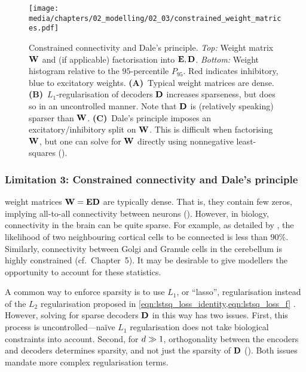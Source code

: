 \begin{figure}
	\texttt{[image: media/chapters/02\_modelling/02\_03/constrained\_weight\_matrices.pdf]}
	{\label{fig:sparsity_and_dales_principle_a}}%
	{\label{fig:sparsity_and_dales_principle_b}}%
	{\label{fig:sparsity_and_dales_principle_c}}%
	\caption[Constrained connectivity and Dale's principle]{Constrained connectivity and Dale's principle. \emph{Top:} Weight matrix $\mathbf{W}$ and (if applicable) factorisation into $\mathbf{E}, \mathbf{D}$. \emph{Bottom:} Weight histogram relative to the $95$-percentile $P_{95}$. Red indicates inhibitory, blue to excitatory weights. \textbf{(A)}~Typical \NEF weight matrices are dense.
	\textbf{(B)}~$L_1$-regularisation of decoders $\mathbf{D}$ increases sparseness, but does so in an uncontrolled manner. Note that $\mathbf{D}$ is (relatively speaking) sparser than $\mathbf{W}$.
	\textbf{(C)}~Dale's principle imposes an excitatory/inhibitory split on $\mathbf{W}$.
	This is difficult when factorising $\mathbf{W}$, but one can solve for $\mathbf{W}$ directly using nonnegative least-squares (\NNLS).
	}
	\label{fig:sparsity_and_dales_principle}
\end{figure}

\subsubsection{Limitation 3: Constrained connectivity and Dale's principle}
\NEF weight matrices $\mathbf{W} = \mathbf{E} \mathbf{D}$ are typically dense.
That is, they contain few zeros, implying all-to-all connectivity between neurons ().
However, in biology, connectivity in the brain can be quite sparse.
For example, as detailed by \citet[Chapter~20]{braitenberg1998cortex}, the likelihood of two neighbouring cortical cells to be connected is less than $90\%$. Similarly, connectivity between Golgi and Granule cells in the cerebellum is highly constrained (cf.~Chapter~5).
It may be desirable to give modellers the opportunity to account for these statistics.

A common way to enforce sparsity is to use $L_1$, or \enquote{lasso}, regularisation instead of the $L_2$ regularisation proposed in \cref{eqn:lstsq_loss_identity,eqn:lstsq_loss_f} \citep[Chapter~6]{boyd2004convex}.
However, solving for sparse decoders $\mathbf{D}$ in this way has two issues.
First, this process is uncontrolled---na\"ive $L_1$ regularisation does not take biological constraints into account.
Second, for $d \gg 1$, orthogonality between the encoders and decoders determines sparsity, and not just the sparsity of $\mathbf{D}$ ().
Both issues mandate more complex regularisation terms.

